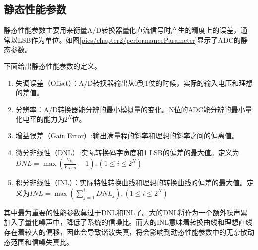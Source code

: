 	
	
	\subsection{静态性能参数}
	
		静态性能参数主要用来衡量A/D转换器量化直流信号时产生的精度上的误差，通常以LSB作为单位。如图\ref{pics/chapter2/performanceParameter}显示了ADC的静态参数。
		\par
		下面给出静态性能参数的定义。
		\par
		
		\begin{enumerate}
			\item 失调误差（Offset）：A/D转换器输出从0到1仗的时候，实际的输入电压和理想的差值。
			\item 分辨率：A/D转换器能分辨的最小模拟量的变化。N位的ADC能分辨的最小量化电平的能力为$2^N$位。
			\item 增益误差（Gain Error）:输出满量程的斜率和理想的斜率之间的偏离值。
			\item 微分非线性（DNL）:实际转换码字宽度和1 LSB的偏差的最大值。定义为$DNL = \max \left( {\frac{{{V_{{D_i}}}}}{{{V_{1LSB}}}} - 1} \right),\left( {1 \le i \le {2^N}} \right)$
			\item 积分非线性（INL）：实际特性转换曲线和理想的转换曲线的偏差的最大值。定义为$INL = \max \left( {\sum\limits_{j = 1}^i {DN{L_j}} } \right),\left( {1 \le i \le {2^N}} \right)$
			
		\end{enumerate}
		其中最为重要的性能参数莫过于DNL和INL了。大的DNL将作为一个额外噪声累加入了量化噪声中，降低了系统的信噪比。而大的INL意味着转换曲线和理想直线存在着较大的偏移，因此会导致谐波失真，将会影响到动态性能参数中的无杂散动态范围和信噪失真比。
	
